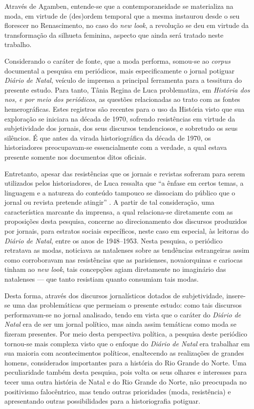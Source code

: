 \begin{refsection}
    Através de Agamben, entende-se que a contemporaneidade se materializa na moda, em virtude de (des)ordem temporal que a mesma instaurou desde o seu florescer no Renascimento, no caso do \textit{new look}, a revolução se deu em virtude da transformação da silhueta feminina, aspecto que ainda será tratado neste trabalho.

    Considerando o caráter de fonte, que a moda performa, somou-se ao \textit{corpus} documental a pesquisa em periódicos, mais especificamente o jornal potiguar \textit{Diário de Natal}, veículo de imprensa a principal ferramenta para a tessitura do presente estudo. Para tanto, Tânia Regina de Luca problematiza, em \textit{História dos nos, e por meio dos periódicos}, as questões relacionadas ao trato com as fontes hemerográficas. Estes registros são recentes para o uso da História visto que sua exploração se iniciara na década de 1970, sofrendo resistências em virtude da subjetividade dos jornais, dos seus discursos tendenciosos, e sobretudo os seus silêncios. É que antes da virada historiográfica da década de 1970, os historiadores preocupavam-se essencialmente com a verdade, a qual estava presente somente nos documentos ditos oficiais.

    Entretanto, apesar das resistências que os jornais e revistas sofreram para serem utilizados pelos historiadores, de Luca ressalta que ``a ênfase em certos temas, a linguagem e a natureza do conteúdo tampouco se dissociam do público que o jornal ou revista pretende atingir'' \cite[p.~140]{Luca2009Historia}. A partir de tal consideração, uma característica marcante da imprensa, a qual relaciona-se diretamente com as proposições desta pesquisa, concerne ao direcionamento dos discursos produzidos por jornais, para estratos sociais específicos, neste caso em especial, às leitoras do \textit{Diário de Natal}, entre os anos de 1948--1953. Nesta pesquisa, o periódico retratava as modas, noticiava as natalenses sobre as tendências estrangeiras assim como corroboravam nas resistências que as parisienses, novaiorquinas e cariocas tinham ao \textit{new look}, tais concepções agiam diretamente no imaginário das natalenses --- que tanto resistiam quanto consumiam tais modas.

    Desta forma, através dos discursos jornalísticos dotados de subjetividade, insere-se uma das problemáticas que permeiam o presente estudo: como tais discursos performavam-se no jornal analisado, tendo em vista que o caráter do \textit{Diário de Natal} era de ser um jornal político, mas ainda assim temáticas como moda se fizeram presentes. Por meio desta perspectiva política, a pesquisa deste periódico tornou-se mais complexa visto que o enfoque do \textit{Diário de Natal} era trabalhar em sua maioria com acontecimentos políticos, enaltecendo as realizações de grandes homens, considerados importantes para a história do Rio Grande do Norte. Uma peculiaridade também desta pesquisa, pois volta os seus olhares e interesses para tecer uma outra história de Natal e do Rio Grande do Norte, não preocupada no positivismo falocêntrico, mas tendo outras prioridades (moda, resistência) e apresentando outras possibilidades para a historiografia potiguar.  


\end{refsection}
